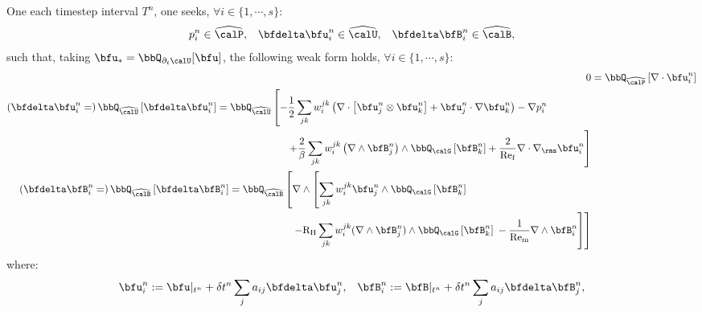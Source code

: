 \begin{example}
        One each timestep interval $T^{n}$, one seeks, $\forall i \in \{1, \cdots, s\}$:
        \begin{align}
                       p_{i}^{n}  \in  \widehat{\calP},  &&
            \bfdelta\bfu_{i}^{n}  \in  \widehat{\calU},  &&
            \bfdelta\bfB_{i}^{n}  \in  \widehat{\calB},
        \end{align}
        such that, taking $\bfu_{*} = \bbQ_{\partial_{t}\calU}[\bfu]$, the following weak form holds, $\forall i \in \{1, \cdots, s\}$:
        \begin{align}
                0
                &=
                \bbQ_{\widehat{\calP}}\left[\nabla\cdot\bfu_{i}^{n}\right]  \\
            \begin{split}
                \left(\bfdelta\bfu_{i}^{n}
                =\right)
                \bbQ_{\widehat{\calU}}\left[\bfdelta\bfu_{i}^{n}\right]
                &=
                \bbQ_{\widehat{\calU}}\left[- \frac{1}{2}\sum_{jk}w_{i}^{jk}\left(\nabla\cdot\left[\bfu_{j}^{n}\otimes\bfu_{k}^{n}\right]
                + \bfu_{j}^{n}\cdot\nabla\bfu_{k}^{n}\right)
                - \nabla p_{i}^{n}\right.  \\
                &\qquad\qquad\qquad\;\;\;\left.+ \frac{2}{\beta}\sum_{jk}w_{i}^{jk}\left(\nabla\wedge\bfB_{j}^{n}\right)\wedge\bbQ_{\calG}\left[\bfB_{k}^{n}\right]
                + \frac{2}{\rmRef}\nabla\cdot\nabla_{\rms}\bfu_{i}^{n}\right]
            \end{split}  \\
            \begin{split}
                \left(\bfdelta\bfB_{i}^{n}
                =\right)
                \bbQ_{\widehat{\calB}}\left[\bfdelta\bfB_{i}^{n}\right]
                &=
                \bbQ_{\widehat{\calB}}\left[\nabla\wedge\left[\sum_{jk}w_{i}^{jk}\bfu_{j}^{n}\wedge\bbQ_{\calG}\left[\bfB_{k}^{n}\right]
                \right.\right.  \\
                &\qquad\qquad\qquad\left.\left.- \rmRH\sum_{jk}w_{i}^{jk}(\nabla\wedge\bfB_{j}^{n})\wedge\bbQ_{\calG}\left[\bfB_{k}^{n}\right]\tall - \frac{1}{\rmRem}\nabla\wedge\bfB_{i}^{n}\right]\right]
            \end{split}
        \end{align}
        where:
        \begin{align}
            \bfu_{i}^{n}  :=  \bfu|_{t^{n}} + \delta t^{n}\sum_{j}a_{ij}\bfdelta\bfu_{j}^{n},  &&
            \bfB_{i}^{n}  :=  \bfB|_{t^{n}} + \delta t^{n}\sum_{j}a_{ij}\bfdelta\bfB_{j}^{n},

\end{align}
\end{example}

